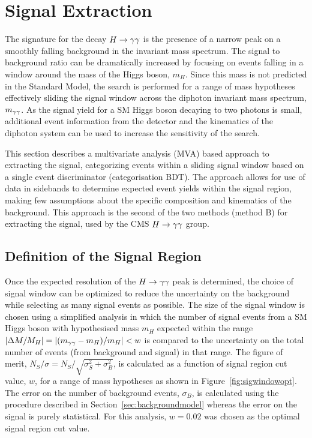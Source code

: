 \section{Signal Extraction}
\label{sec:signalextraction}
The signature for the decay $H\rightarrow\gamma\gamma$ is the presence of a narrow peak on a smoothly falling background in 
the invariant mass spectrum. 
The signal to background ratio can be dramatically increased by focusing on events falling in a window 
around the mass of the Higgs boson, $m_{H}$. Since this mass is not predicted in the Standard Model, 
the search is performed for a range of mass hypotheses effectively sliding the signal window across 
the diphoton invariant mass spectrum, $m_{\gamma\gamma}$.
As the signal yield for a SM Higgs boson decaying to two photons is small, 
additional event information from the detector and the kinematics of the diphoton system can be used to 
increase the sensitivity of the search. 

This section describes a multivariate analysis (MVA) based approach to extracting the signal, categorizing events within a sliding 
signal window based on a single event discriminator (categorisation BDT). The approach allows for use of data in sidebands
to determine expected event yields within the signal region, making few assumptions about the specific
composition and kinematics of the background. This approach is the second of the two methods (method B) for extracting the signal, used by the CMS $H\rightarrow\gamma\gamma$ group.

\subsection{Definition of the Signal Region}

Once the expected resolution of the $H\rightarrow\gamma\gamma$ peak is determined, the choice of signal window can be optimized
to reduce the uncertainty on the background while selecting as many signal events as possible.
The size of the signal window is chosen using a simplified analysis in which the number of signal events
from a SM Higgs boson with hypothesised mass $m_{H}$ expected within the range $|\Delta M/M_{H}|=|(m_{\gamma\gamma}-m_{H})/m_{H}| < w$ 
is compared to the uncertainty on the total number of events (from background and signal) in that range.
The figure of merit, $N_{S}/\sigma = N_{S}/\sqrt{\sigma_{S}^{2} + \sigma_{B}^{2}}$, is calculated as
a function of signal region cut value, $w$, for a range of mass hypotheses as shown in Figure~\ref{fig:sigwindowopt}. 
The error on the number of background events, $\sigma_{B}$, is calculated using the procedure described in 
Section~\ref{sec:backgroundmodel} whereas the error on the signal is purely statistical.
For this analysis, $w=0.02$ was chosen as the optimal signal region cut value.


